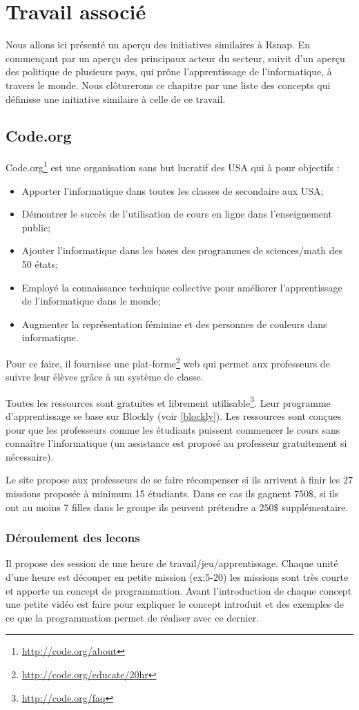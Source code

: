 \section{Travail associé}
Nous allons ici présenté un aperçu des initiatives similaires à Rsnap. En commençant par un aperçu des principaux acteur du secteur, suivit d'un aperçu des politique de plusieurs pays, qui prône l'apprentissage de l'informatique, à travers le monde. Nous clôturerons ce chapitre par une liste des concepts qui définisse une initiative similaire à celle de ce travail.
\subsection{Code.org}
Code.org\footnote{\url{http://code.org/about}} est une organisation sans but lucratif des USA qui à pour objectifs :
\begin{itemize}
  \item Apporter l'informatique dans toutes les classes de secondaire aux USA;
  \item Démontrer le succès de l'utilisation de cours en ligne dans l'enseignement public;
  \item Ajouter l'informatique dans les bases des programmes de sciences/math des 50 états;
  \item Employé la connaissance technique collective pour améliorer l'apprentissage de l'informatique dans le monde;
  \item Augmenter la représentation féminine et des personnes de couleurs dans informatique.
\end{itemize}

Pour ce faire, il fournisse une plat-forme\footnote{\url{http://code.org/educate/20hr}} web qui permet aux professeurs de suivre leur élèves grâce à un système de classe.

Toutes les ressources sont gratuites et librement utilisable\footnote{\url{http://code.org/faq}}. Leur programme d'apprentissage se base sur Blockly (voir \ref{blockly}).
Les ressources sont conçues pour que les professeurs comme les étudiants puissent commencer le cours sans connaître l'informatique (un assistance est proposé au professeur gratuitement si nécessaire).

Le site propose aux professeurs de se faire récompenser si ils arrivent à finir les 27 missions proposée à  minimum 15 étudiants. Dans ce cas ils gagnent $750\$$, si ils ont au moins 7 filles dans le groupe ils peuvent prétendre a $250\$$ supplémentaire.

\subsubsection{Déroulement des lecons}
Il propose des session de une heure de travail/jeu/apprentissage. Chaque unité d'une heure est découper en petite mission (ex:5-20) les missions sont très courte et apporte un concept de programmation. Avant l'introduction de chaque concept une petite vidéo est faire pour expliquer le concept introduit et des exemples de ce que la programmation permet de réaliser avec ce dernier.


